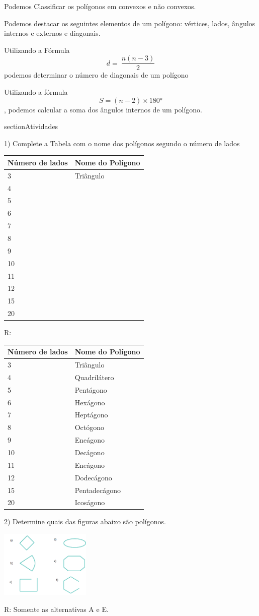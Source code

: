 Podemos Classificar os polígonos em convexos e não convexos.

Podemos destacar os seguintes elementos de um polígono: vértices, lados,
ângulos internos e externos e diagonais.

Utilizando a Fórmula \[d = \ \frac{n(n - 3)}{2}\] podemos determinar o
número de diagonais de um polígono

Utilizando a fórmula \[S = (n - 2) \times 180°\], podemos calcular a
soma dos ângulos internos de um polígono.

section{Atividades}

1) Complete a Tabela com o nome dos polígonos segundo o número de lados


\begin{longtable}[]{@{}ll@{}}
\toprule
Número de lados & Nome do Polígono\tabularnewline
\midrule
\endhead
3 & Triângulo\tabularnewline
4 & ~\tabularnewline
5 & ~\tabularnewline
6 & ~\tabularnewline
7 & ~\tabularnewline
8 & ~\tabularnewline
9 & ~\tabularnewline
10 & ~\tabularnewline
11 & ~\tabularnewline
12 & ~\tabularnewline
15 & ~\tabularnewline
20 & ~\tabularnewline
\bottomrule
\end{longtable}

R:

\begin{longtable}[]{@{}ll@{}}
\toprule
Número de lados & Nome do Polígono\tabularnewline
\midrule
\endhead
3 & Triângulo\tabularnewline
4 & Quadrilátero\tabularnewline
5 & Pentágono\tabularnewline
6 & Hexágono\tabularnewline
7 & Heptágono\tabularnewline
8 & Octógono\tabularnewline
9 & Eneágono\tabularnewline
10 & Decágono\tabularnewline
11 & Eneágono\tabularnewline
12 & Dodecágono\tabularnewline
15 & Pentadecágono\tabularnewline
20 & Icoságono\tabularnewline
\bottomrule
\end{longtable}

2) Determine quais das figuras abaixo são polígonos.

\includegraphics[width=1.7in,height=1.26763in]{./imgSAEB_8_MAT/media/image7.png}

R: Somente as alternativas A e E.

